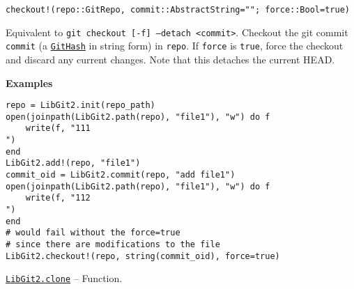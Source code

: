 \begin{adjustwidth}{2em}{0pt}


\begin{verbatim}
checkout!(repo::GitRepo, commit::AbstractString=""; force::Bool=true)
\end{verbatim}

Equivalent to \texttt{git checkout [-f] --detach <commit>}. Checkout the git commit \texttt{commit} (a \hyperlink{202290709580230708}{\texttt{GitHash}} in string form) in \texttt{repo}. If \texttt{force} is \texttt{true}, force the checkout and discard any current changes. Note that this detaches the current HEAD.

\textbf{Examples}


\begin{verbatim}
repo = LibGit2.init(repo_path)
open(joinpath(LibGit2.path(repo), "file1"), "w") do f
    write(f, "111
")
end
LibGit2.add!(repo, "file1")
commit_oid = LibGit2.commit(repo, "add file1")
open(joinpath(LibGit2.path(repo), "file1"), "w") do f
    write(f, "112
")
end
# would fail without the force=true
# since there are modifications to the file
LibGit2.checkout!(repo, string(commit_oid), force=true)
\end{verbatim}



\end{adjustwidth}
\hypertarget{7099795087604363090}{}
\hyperlink{7099795087604363090}{\texttt{LibGit2.clone}}  -- {Function.}

